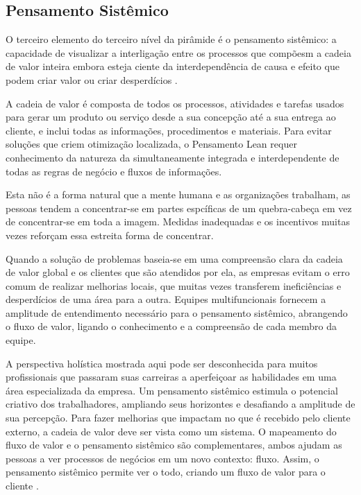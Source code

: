 \begin{anexosenv}
\subsection[Pensamento Sistêmico]{Pensamento Sistêmico}

O terceiro elemento do terceiro nível da pirâmide é o pensamento sistêmico: a capacidade de visualizar a interligação entre os processos que compõesm a cadeia de valor inteira embora esteja ciente da interdependência de causa e efeito que podem criar valor ou criar desperdícios \cite{bell2011}.

A cadeia de valor é composta de todos os processos, atividades e tarefas usados para gerar um produto ou serviço desde a sua concepção até a sua entrega ao cliente, e inclui todas as informações, procedimentos e materiais. Para evitar soluções que criem otimização localizada, o Pensamento Lean requer conhecimento da natureza da simultaneamente integrada e interdependente  de todas as regras de negócio e fluxos de informações.   

Esta não é a forma natural que a mente humana e as organizações trabalham, as pessoas tendem a concentrar-se em partes espcíficas de um quebra-cabeça em vez de concentrar-se em toda a imagem. Medidas inadequadas e os incentivos muitas vezes reforçam essa estreita forma de concentrar.

Quando a solução de problemas baseia-se em uma compreensão clara da cadeia de valor global e os clientes que são atendidos por ela, as empresas evitam o erro comum de realizar melhorias locais, que muitas vezes transferem ineficiências e desperdícios de uma área para a outra. Equipes multifuncionais fornecem a amplitude de entendimento necessário para o pensamento sistêmico, abrangendo o fluxo de valor, ligando o conhecimento e a compreensão de cada membro da equipe.

A perspectiva holística mostrada aqui pode ser desconhecida para muitos profissionais que passaram suas carreiras a aperfeiçoar as habilidades em uma área especializada da empresa. Um pensamento sistêmico estimula o potencial criativo dos trabalhadores, ampliando seus horizontes e desafiando a amplitude de sua percepção. Para fazer melhorias que impactam no que é recebido pelo cliente externo, a cadeia de valor deve ser vista como um sistema. O mapeamento do fluxo de valor e o pensamento sistêmico são complementares, ambos ajudam as pessoas a ver processos de negócios em um novo contexto: fluxo. Assim, o pensamento sistêmico permite ver o todo, criando um fluxo de valor para o cliente \cite{bell2011}.


\end{anexosenv}
